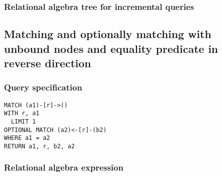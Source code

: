 \subsubsection*{Relational algebra tree for incremental queries}


\subsection{Matching and optionally matching with unbound nodes and equality predicate in reverse direction}

\subsubsection*{Query specification}

\begin{lstlisting}
MATCH (a1)-[r]->()
WITH r, a1
  LIMIT 1
OPTIONAL MATCH (a2)<-[r]-(b2)
WHERE a1 = a2
RETURN a1, r, b2, a2
\end{lstlisting}

\subsubsection*{Relational algebra expression}

